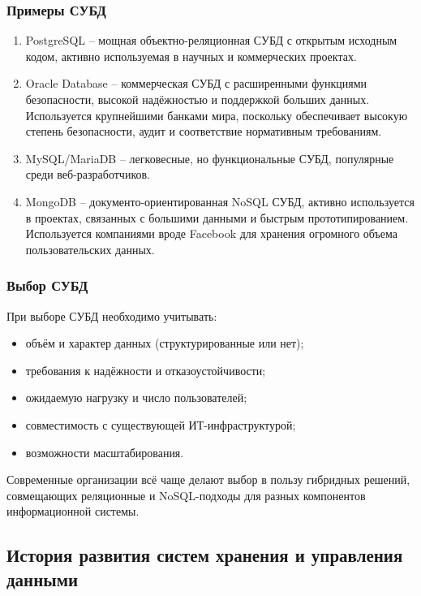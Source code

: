 \subsubsection{Примеры СУБД}

\begin{enumerate}
	\item PostgreSQL -- мощная объектно-реляционная СУБД с открытым исходным кодом, активно используемая в научных и коммерческих проектах.
	\item Oracle Database -- коммерческая СУБД с расширенными функциями безопасности, высокой надёжностью и поддержкой больших данных. Используется крупнейшими банками мира, поскольку обеспечивает высокую степень безопасности, аудит и соответствие нормативным требованиям.
	\item MySQL/MariaDB -- легковесные, но функциональные СУБД, популярные среди веб-разработчиков.
	\item MongoDB -- документо-ориентированная NoSQL СУБД, активно используется в проектах, связанных с большими данными и быстрым прототипированием. Используется компаниями вроде Facebook для хранения огромного объема пользовательских данных.
\end{enumerate}

\subsubsection{Выбор СУБД}

При выборе СУБД необходимо учитывать:
\begin{itemize}
	\item объём и характер данных (структурированные или нет);
	\item требования к надёжности и отказоустойчивости;
	\item ожидаемую нагрузку и число пользователей;
	\item совместимость с существующей ИТ-инфраструктурой;
	\item возможности масштабирования.
\end{itemize}

Современные организации всё чаще делают выбор в пользу гибридных решений, совмещающих реляционные и NoSQL-подходы для разных компонентов информационной системы.

\subsection{История развития систем хранения и управления данными}

